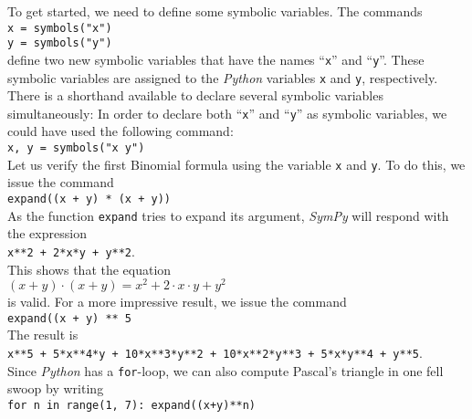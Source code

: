 \documentclass{article}
\begin{document}
To get started, we need to define some symbolic variables.  The commands
\\[0.2cm]
\hspace*{1.3cm}
\texttt{x = symbols("x")} \\
\hspace*{1.3cm}
\texttt{y = symbols("y")}
\\[0.2cm]
define two new symbolic variables that have the names ``\texttt{x}'' and ``\texttt{y}''.  These
symbolic variables are assigned to the \textsl{Python} variables \texttt{x} and \texttt{y},
respectively.  There is a shorthand available to declare several symbolic variables simultaneously:
In order to declare both ``\texttt{x}'' and ``\texttt{y}'' as symbolic variables, we could have used
the following command:
\\[0.2cm]
\hspace*{1.3cm}
\texttt{x, y = symbols("x y")}
\\[0.2cm]
Let us verify the first Binomial formula using the variable \texttt{x} and \texttt{y}.  To do this,
we issue the command
\\[0.2cm]
\hspace*{1.3cm}
\texttt{expand((x + y) * (x + y))}
\\[0.2cm]
As the function \texttt{expand} tries to expand its argument, \textsl{SymPy} will respond with the expression
\\[0.2cm]
\hspace*{1.3cm}
\texttt{x**2 + 2*x*y + y**2}.
\\[0.2cm]
This shows that the equation
\\[0.2cm]
\hspace*{1.3cm}
$(x + y) \cdot (x + y) = x^2 + 2 \cdot x \cdot y + y^2$
\\[0.2cm]
is valid.  For a more impressive result, we issue the command
\\[0.2cm]
\hspace*{1.3cm}
\texttt{expand((x + y) ** 5}
\\[0.2cm]
The result is
\\[0.2cm]
\hspace*{1.3cm}
\texttt{x**5 + 5*x**4*y + 10*x**3*y**2 + 10*x**2*y**3 + 5*x*y**4 + y**5}.
\\[0.2cm]
Since \textsl{Python} has a \texttt{for}-loop, we can also compute Pascal's triangle in one fell
swoop by writing
\\[0.2cm]
\hspace*{1.3cm}
\texttt{for n in range(1, 7): expand((x+y)**n)}
\\[0.2cm]
\end{document}
